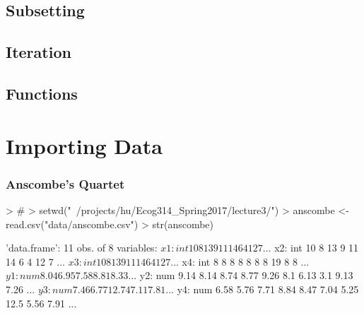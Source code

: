 \documentclass{beamer}
\begin{document}
\subsection{Subsetting}
\begin{frame}
\end{frame}



\subsection{Iteration}
\begin{frame}
\end{frame}



\subsection{Functions}
\begin{frame}
\end{frame}



\section{Importing Data}
\begin{frame}
\end{frame}



\begin{frame}[fragile]
\frametitle{Anscombe's Quartet}

\begin{Schunk}
\begin{Sinput}
> # 
> setwd("~/projects/hu/Ecog314_Spring2017/lecture3/")
> anscombe <- read.csv("data/anscombe.csv")
> str(anscombe)
\end{Sinput}
\begin{Soutput}
'data.frame':	11 obs. of  8 variables:
 $ x1: int  10 8 13 9 11 14 6 4 12 7 ...
 $ x2: int  10 8 13 9 11 14 6 4 12 7 ...
 $ x3: int  10 8 13 9 11 14 6 4 12 7 ...
 $ x4: int  8 8 8 8 8 8 8 19 8 8 ...
 $ y1: num  8.04 6.95 7.58 8.81 8.33 ...
 $ y2: num  9.14 8.14 8.74 8.77 9.26 8.1 6.13 3.1 9.13 7.26 ...
 $ y3: num  7.46 6.77 12.74 7.11 7.81 ...
 $ y4: num  6.58 5.76 7.71 8.84 8.47 7.04 5.25 12.5 5.56 7.91 ...
\end{Soutput}
\end{Schunk}
\end{frame}
\end{document}
